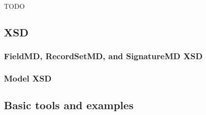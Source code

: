 \documentclass[10pt]{article}
\begin{document}
\ifHOLD
TODO

\subsection{XSD}

\subsubsection{FieldMD, RecordSetMD, and SignatureMD XSD}

\subsubsection{Model XSD}

\subsection{Basic tools and examples}

\fi










\vfill
\strut
\clearpage

\printindex
\end{document}
